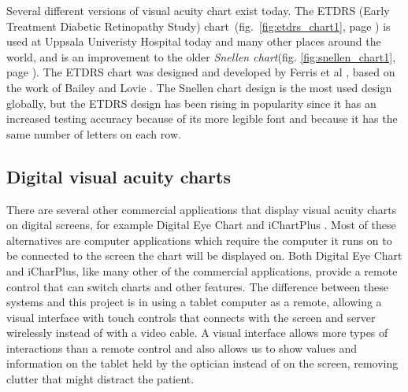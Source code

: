 \documentclass[12pt,a4paper,notitlepage]{report}
\begin{document}
Several different versions of visual acuity chart exist today. The ETDRS (Early Treatment Diabetic Retinopathy Study) chart~(fig.~\ref{fig:etdrs_chart1}, page \pageref{fig:etdrs_chart1}) is used at Uppsala Univeristy Hospital today and many other places around the world, and is an improvement to the older \textit{Snellen chart}(fig. \ref{fig:snellen_chart1}, page \pageref{fig:snellen_chart1}). The ETDRS chart was designed and developed by Ferris et al \cite{Ferris}, based on the work of Bailey and Lovie \cite{Bailey}. The Snellen chart design is the most used design globally, but the ETDRS design has been rising in popularity since it has an increased testing accuracy because of its more legible font and because it has the same number of letters on each row.



\subsection{Digital visual acuity charts}

There are several other commercial applications that display visual acuity charts on digital screens, for example Digital Eye Chart \cite{digitaleyechart} and iChartPlus \cite{ichartplus}. Most of these alternatives are computer applications which require the computer it runs on to be connected to the screen the chart will be displayed on. Both Digital Eye Chart and iCharPlus, like many other of the commercial applications, provide a remote control that can switch charts and other features. The difference between these systems and this project is in using a tablet computer as a remote, allowing a visual interface with touch controls that connects with the screen and server wirelessly instead of with a video cable. A visual interface allows more types of interactions than a remote control and also allows us to show values and information on the tablet held by the optician instead of on the screen, removing clutter that might distract the patient.
\end{document}
